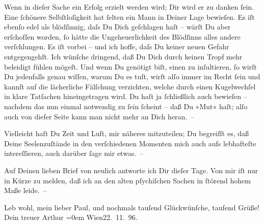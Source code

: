 \pstart
           Wenn in dieſer Sache ein Erfolg erzielt werden wird; Dir wird er zu danken{ }ſein. Eine{ }ſchönere Selbſtloſig{\pb}keit hat{ }ſelten ein Mann in
               Deiner Lage bewieſen. Es iſt ebenſo edel als blödſinnig, daſs Du Dich geſchlagen haſt
               – wärſt Du aber erſchoſſen worden,{ }ſo hätte die Ungeheuerlichkeit des Blödſinns alles
               andere verſchlungen. Es iſt vorbei – und ich hoffe, daſs Du keiner neuen Gefahr
                  entgegen{\pb}gehſt. Ich wünſche dringend, daß Du Dich
               durch keinen Tropf mehr beleidigt fühlen mögeſt. Und wenn Du genötigt biſt, einen zu
               inſultieren,{ }ſo wirſt Du jedenfalls genau wiſſen, warum Du es tuſt, wirſt alſo immer
               im Recht{ }ſein und kannſt auf die lächerliche Fälſchung verzichten, welche durch einen
               Kugelwechſel in klare Tatſachen hineingetragen wird. Du haſt ja{ }ſchließlich auch
               bewieſen – nachdem das nun einmal notwendig zu{ }ſein{ }ſcheint – daß Du »Mut« haſt; alſo
               auch von dieſer Seite kann man nicht mehr an Dich heran. –\pend
           
\pstart
           {\pb}Vielleicht haſt Du Zeit und Luſt, mir näheres
               mitzuteilen; Du begreifſt es, daß Deine Seelenzuſtände in den verſchiedenen Momenten
               mich auch aufs lebhafteſte intereſſieren, auch darüber{ }ſage mir etwas. –\pend
           
\pstart
           Auf Deinen lieben Brief von neulich antworte ich Dir dieſer Tage. Von mir iſt nur in
               Kürze zu melden, daß ich an den alten pſychiſchen Sachen in{ }ſtörend hohem Maße
               leide. –\pend
           
\pstart
           Leb wohl, mein lieber Paul, und nochmals tauſend Glückwünſche, tauſend Grüße!
               {\\[\baselineskip]}Dein treuer \spacefill\mbox{Arthur}\pend
           \leftskip=0em{}
\pstart
           Wien22. 11. 96.\pend
           \endnumbering{}  \newcommand{\dateiname}{L02686}\newcommand{\titel}{Arthur Schnitzler an Paul Goldmann, 22. 11. 1896}\newcommand{\editorInnen}{Martin Anton Müller und Laura Untner}
